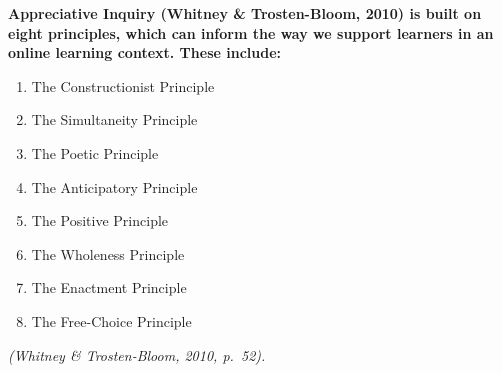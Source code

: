\documentclass[
]{book}
\providecommand{\tightlist}{%
  \setlength{\itemsep}{0pt}\setlength{\parskip}{0pt}}
\begin{document}
\textbf{Appreciative Inquiry (Whitney \& Trosten-Bloom, 2010) is built on eight principles, which can inform the way we support learners in an online learning context. These include:}

\begin{enumerate}
\def\labelenumi{\arabic{enumi}.}
\tightlist
\item
  The Constructionist Principle\\
\item
  The Simultaneity Principle\\
\item
  The Poetic Principle\\
\item
  The Anticipatory Principle\\
\item
  The Positive Principle\\
\item
  The Wholeness Principle\\
\item
  The Enactment Principle\\
\item
  The Free-Choice Principle
\end{enumerate}

\emph{(Whitney \& Trosten-Bloom, 2010, p.~52).}
\end{document}
